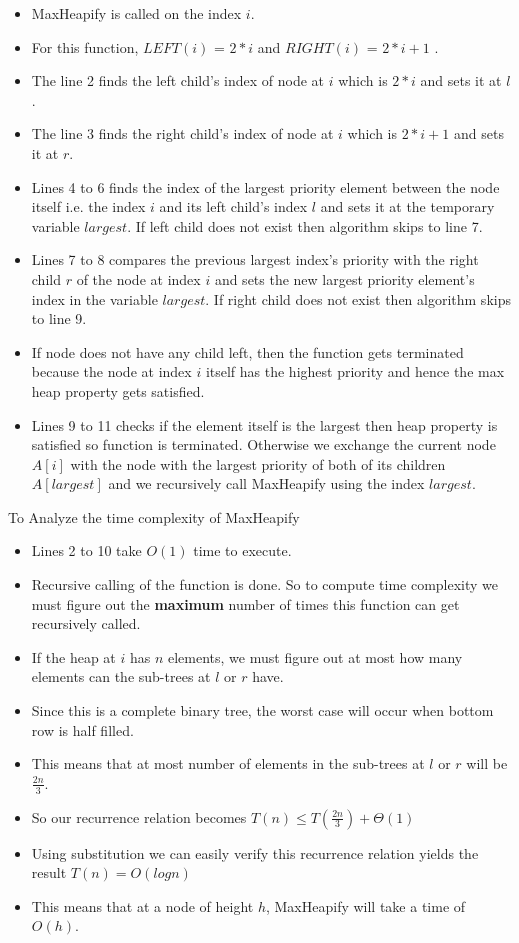 
    \begin{itemize}
        \item Max\textunderscore Heapify is called on the index $i$. 
        \item For this function,  $LEFT(i)$ = $2*i$ and  $RIGHT(i)$ = $2*i + 1$ .
        \item The line 2 finds the left child's index of node at $i$ which is $2*i$ and sets it at $l$.
        \item The line 3 finds the right child's index of node at $i$ which is $2*i + 1$ and sets it at $r$.
        \item Lines 4 to 6 finds the index of the largest priority element between the node itself i.e. the index $i$ and its left child's index $l$ and sets it at the temporary variable $largest$. If left child does not exist then algorithm skips to line 7.
        \item Lines 7 to 8 compares the previous largest index's priority with the right child $r$ of the node at index $i$ and sets the new largest priority element's index in the variable $largest$. If right child does not exist then algorithm skips to line 9.
        \item If node does not have any child left, then the function gets terminated because the node at index $i$ itself has the highest priority and hence the max heap property gets satisfied.
        \item Lines 9 to 11 checks if the element itself is the largest then heap property is satisfied so function is terminated. Otherwise we exchange the current node $A[i]$ with the node with the largest priority of both of its children $A[largest]$ and we recursively call Max\textunderscore Heapify using the index $largest$.
    \end{itemize}
    \newpage
    To Analyze the time complexity of Max\textunderscore Heapify
    \begin{itemize}
        \item Lines 2 to 10 take $O(1)$ time to execute.
        \item Recursive calling of the function is done. So to compute time complexity we must figure out the \textbf{maximum} number of times this function can get recursively called.
        \item If the heap at $i$ has $n$ elements, we must figure out at most how many elements can the sub-trees at $l$ or $r$ have.
        \item Since this is a complete binary tree, the worst case will occur when bottom row is half filled.
        \item This means that at most number of elements in the sub-trees at $l$ or $r$ will be $\frac{2n}{3}$. 
        \item So our recurrence relation becomes $T(n) \leqslant T(\frac{2n}{3}) + \Theta(1)$
        \item Using substitution we can easily verify this recurrence relation yields the result $T(n) = O(log n)$
        \item This means that at a node of height $h$, Max\textunderscore Heapify will take a time of $O(h)$.
    \end{itemize}